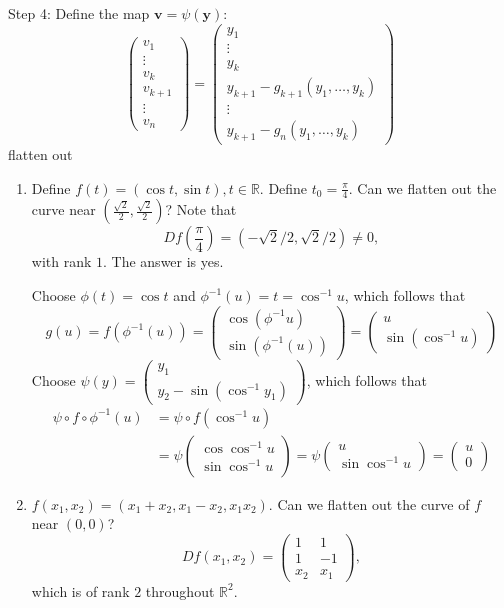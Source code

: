 Step 4: Define the map $\bm v=\psi(\bm y)$:
\[
\begin{pmatrix}
v_1\\\vdots\\v_k\\v_{k+1}\\\vdots\\v_n
\end{pmatrix}
=
\begin{pmatrix}
y_1\\\vdots\\y_k\\y_{k+1}-g_{k+1}(y_1,\dots,y_k)\\\vdots\\
y_{k+1} - g_n(y_1,\dots,y_k)
\end{pmatrix}
\]
flatten out
\begin{example}
\begin{enumerate}
\item
Define $f(t)=(\cos t,\sin t), t\in\mathbb{R}$. Define $t_0=\frac{\pi}{4}$. Can we flatten out the curve near $(\frac{\sqrt{2}}{2},\frac{\sqrt{2}}{2})$? Note that
\[
Df(\frac{\pi}{4})=(-\sqrt{2}/2,\sqrt{2}/2)\ne0,
\]
with rank $1$. The answer is yes.

Choose $\phi(t)=\cos t$ and $\phi^{-1}(u)=t=\cos^{-1}u$, which follows that
\[
g(u)=f(\phi^{-1}(u))=\begin{pmatrix}
\cos(\phi^{-1}u)\\\sin(\phi^{-1}(u))
\end{pmatrix}
=\begin{pmatrix}
u\\
\sin(\cos^{-1}u)
\end{pmatrix}
\]
Choose $\psi(y)=\begin{pmatrix}
y_1\\y_2-\sin(\cos^{-1}y_1)
\end{pmatrix}$, which follows that
\begin{align*}
\psi\circ f\circ\phi^{-1}(u)
&=
\psi\circ f(\cos^{-1}u)\\
&=\psi\begin{pmatrix}
\cos\cos^{-1}u
\\
\sin\cos^{-1}u
\end{pmatrix}=
\psi\begin{pmatrix}
u
\\
\sin\cos^{-1}u
\end{pmatrix}
=\begin{pmatrix}
u\\0
\end{pmatrix}
\end{align*}
\item
$f(x_1,x_2)=(x_1+x_2,x_1-x_2,x_1x_2)$. Can we flatten out the curve of $f$ near $(0,0)$?
\[
Df(x_1,x_2)=\begin{pmatrix}
1&1\\
1&-1\\
x_2&x_1
\end{pmatrix},
\]
which is of rank $2$ throughout $\mathbb{R}^2$.


\end{enumerate}
\end{example}
